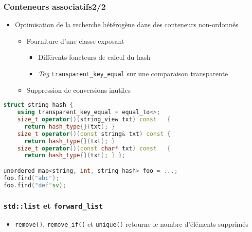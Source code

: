 \documentclass[C++.tex]{subfiles}
\begin{document}
\begin{frame}[fragile]
	\frametitle{Conteneurs associatifs\titlehfill{}2/2}
	\begin{itemize}
		\item Optimisation de la recherche hétérogène dans des conteneurs non-ordonnés
		\begin{itemize}
			\item Fourniture d'une classe exposant
			\begin{itemize}
				\item Différents foncteurs de calcul du hash
				\item \textit{Tag} \lstinline|transparent_key_equal| sur une comparaison transparente


			\end{itemize}
			\item Suppression de conversions inutiles
		\end{itemize}
	\end{itemize}

	\begin{lstlisting}[language=C++]
struct string_hash {
	using transparent_key_equal = equal_to<>;
	size_t operator()(string_view txt) const   { 
	  return hash_type{}(txt); }
	size_t operator()(const string& txt) const {
	  return hash_type{}(txt); }
	size_t operator()(const char* txt) const   {
	  return hash_type{}(txt); } };

unordered_map<string, int, string_hash> foo = ...;
foo.find("abc");
foo.find("def"sv);\end{lstlisting}
\end{frame}

\begin{frame}[fragile]
	\frametitle{\lstinline|std::list| et \lstinline|forward_list|}
	\begin{itemize}
		\item \lstinline|remove()|, \lstinline|remove_if()| et \lstinline|unique()| retourne le nombre d'éléments supprimés
	\end{itemize}
\end{frame}
\end{document}
